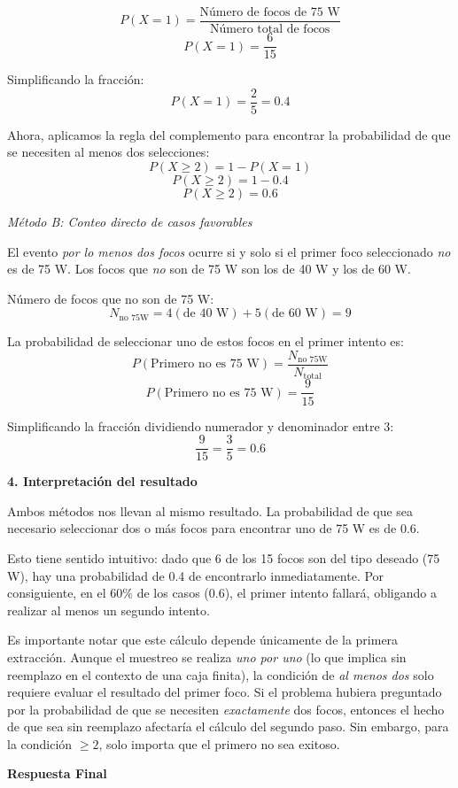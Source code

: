 \documentclass[a4paper]{article}
\begin{document}
$$ P(X = 1) = \frac{\text{Número de focos de 75 W}}{\text{Número total de focos}} $$
$$ P(X = 1) = \frac{6}{15} $$

Simplificando la fracción:
$$ P(X = 1) = \frac{2}{5} = 0.4 $$

Ahora, aplicamos la regla del complemento para encontrar la probabilidad de que se necesiten al menos dos selecciones:
$$ P(X \ge 2) = 1 - P(X = 1) $$
$$ P(X \ge 2) = 1 - 0.4 $$
$$ P(X \ge 2) = 0.6 $$

\textit{Método B: Conteo directo de casos favorables}

El evento \textit{por lo menos dos focos} ocurre si y solo si el primer foco seleccionado \textit{no} es de 75 W.
Los focos que \textit{no} son de 75 W son los de 40 W y los de 60 W.

Número de focos que no son de 75 W:
$$ N_{\text{no 75W}} = 4 (\text{de 40 W}) + 5 (\text{de 60 W}) = 9 $$

La probabilidad de seleccionar uno de estos focos en el primer intento es:
$$ P(\text{Primero no es 75 W}) = \frac{N_{\text{no 75W}}}{N_{\text{total}}} $$
$$ P(\text{Primero no es 75 W}) = \frac{9}{15} $$

Simplificando la fracción dividiendo numerador y denominador entre 3:
$$ \frac{9}{15} = \frac{3}{5} = 0.6 $$

\textbf{4. Interpretación del resultado}

Ambos métodos nos llevan al mismo resultado. La probabilidad de que sea necesario seleccionar dos o más focos para encontrar uno de 75 W es de 0.6.

Esto tiene sentido intuitivo: dado que 6 de los 15 focos son del tipo deseado (75 W), hay una probabilidad de 0.4 de encontrarlo inmediatamente. Por consiguiente, en el 60\% de los casos (0.6), el primer intento fallará, obligando a realizar al menos un segundo intento.

Es importante notar que este cálculo depende únicamente de la primera extracción. Aunque el muestreo se realiza \textit{uno por uno} (lo que implica sin reemplazo en el contexto de una caja finita), la condición de \textit{al menos dos} solo requiere evaluar el resultado del primer foco. Si el problema hubiera preguntado por la probabilidad de que se necesiten \textit{exactamente} dos focos, entonces el hecho de que sea sin reemplazo afectaría el cálculo del segundo paso. Sin embargo, para la condición $\ge 2$, solo importa que el primero no sea exitoso.

\textbf{Respuesta Final}
\end{document}
